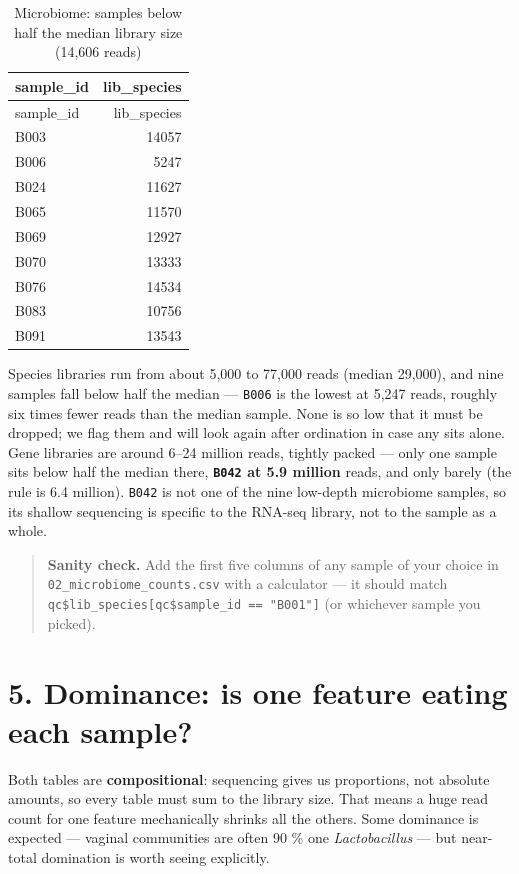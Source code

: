 \documentclass[
  letterpaper,
  DIV=11,
  numbers=noendperiod]{scrartcl}
\begin{document}
\begin{longtable}[]{@{}lr@{}}
\caption{Microbiome: samples below half the median library size (14,606
reads)}\tabularnewline
\toprule\noalign{}
sample\_id & lib\_species \\
\midrule\noalign{}
\endfirsthead
\toprule\noalign{}
sample\_id & lib\_species \\
\midrule\noalign{}
\endhead
\bottomrule\noalign{}
\endlastfoot
B003 & 14057 \\
B006 & 5247 \\
B024 & 11627 \\
B065 & 11570 \\
B069 & 12927 \\
B070 & 13333 \\
B076 & 14534 \\
B083 & 10756 \\
B091 & 13543 \\
\end{longtable}

Species libraries run from about 5,000 to 77,000 reads (median 29,000),
and nine samples fall below half the median --- \texttt{B006} is the
lowest at 5,247 reads, roughly six times fewer reads than the median
sample. None is so low that it must be dropped; we flag them and will
look again after ordination in case any sits alone. Gene libraries are
around 6--24 million reads, tightly packed --- only one sample sits
below half the median there, \textbf{\texttt{B042} at 5.9 million}
reads, and only barely (the rule is 6.4 million). \texttt{B042} is not
one of the nine low-depth microbiome samples, so its shallow sequencing
is specific to the RNA-seq library, not to the sample as a whole.

\begin{quote}
\textbf{Sanity check.} Add the first five columns of any sample of your
choice in \texttt{02\_microbiome\_counts.csv} with a calculator --- it
should match \texttt{qc\$lib\_species{[}qc\$sample\_id\ ==\ "B001"{]}}
(or whichever sample you picked).
\end{quote}

\section{5. Dominance: is one feature eating each
sample?}\label{dominance-is-one-feature-eating-each-sample}

Both tables are \textbf{compositional}: sequencing gives us proportions,
not absolute amounts, so every table must sum to the library size. That
means a huge read count for one feature mechanically shrinks all the
others. Some dominance is expected --- vaginal communities are often 90
\% one \emph{Lactobacillus} --- but near-total domination is worth
seeing explicitly.
\end{document}
